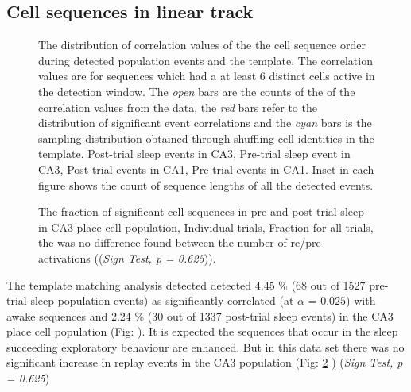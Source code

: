 \begin{figure}[hb!]
\centering

\end{figure}



\subsection{Cell sequences in linear track}

\begin{figure}[H]
\centering
{}
\caption[Template matching analysis]{The distribution of correlation values of the the cell sequence order during detected population events and the template. The correlation values are for sequences which had a at least 6 distinct cells active in the detection window. The \emph{open} bars are the counts of the of the correlation values from the data, the \emph{red} bars refer to the distribution of significant event correlations and the \emph{cyan} bars is the sampling distribution obtained through shuffling cell identities in the template.  Post-trial sleep events in CA3,   Pre-trial sleep event in CA3,  Post-trial events in CA1,   Pre-trial events in CA1. Inset in each figure shows the count of sequence lengths of all the detected events.}
\label{tmcorr}
\end{figure}

\begin{figure}[H!]
\centering
{}
\caption[Pre and post trial sleep events CA3]{The fraction of significant cell sequences in pre and post trial sleep in CA3 place cell population,  Individual trials,  Fraction for all trials, the was no difference found between the number of re/pre-activations ((\emph{Sign Test, p = 0.625})).}
\label{fig:pre2postca3}
\end{figure}
The template matching analysis detected detected 4.45 \% (68 out of 1527 pre-trial sleep population events) as significantly correlated (at $ \alpha $ = $0.025$) with awake sequences and 2.24 \% (30 out of 1337 post-trial sleep events) in the CA3 place cell population (Fig:  ). It is expected the sequences that occur in the sleep succeeding exploratory behaviour are enhanced. But in this data set there was no significant increase in replay events in the CA3 population (Fig: \ref{fig:pre2postca3} ) (\emph{Sign Test, p = 0.625})

